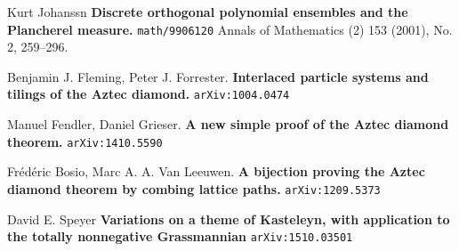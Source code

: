 \documentclass[12pt]{article}
\begin{document}
\selectfont \fontsize{12}{10}\selectfont

\begin{thebibliography}{}

\item Kurt Johanssn \textbf{Discrete orthogonal polynomial ensembles and the Plancherel measure.} \texttt{math/9906120} Annals of Mathematics (2) 153 (2001), No. 2, 259--296.

\item Benjamin J. Fleming, Peter J. Forrester.  \textbf{Interlaced particle systems and tilings of the Aztec diamond.} \texttt{arXiv:1004.0474}

\item Manuel Fendler, Daniel Grieser.	 \textbf{A new simple proof of the Aztec diamond theorem.}  \texttt{arXiv:1410.5590} 

\item Fr\'{e}d\'{e}ric Bosio, Marc A. A. Van Leeuwen.  \textbf{A bijection proving the Aztec diamond theorem by combing lattice paths.} \texttt{arXiv:1209.5373}

\item David E. Speyer \textbf{Variations on a theme of Kasteleyn, with application to the totally nonnegative Grassmannian} \texttt{arXiv:1510.03501}

\end{thebibliography}
\end{document}
